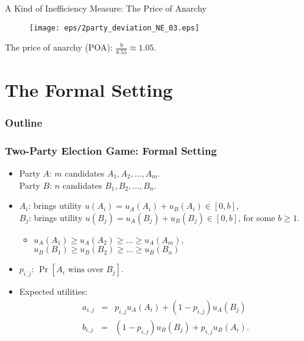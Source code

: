 \documentclass[xcolor=dvipsnames,envcountsect]{beamer}
\begin{document}
\begin{frame}{A Kind of Inefficiency Measure: The Price of Anarchy}
	\begin{figure}
		\begin{center}
			\texttt{[image: eps/2party\_deviation\_NE\_03.eps]}
		\end{center}
	\end{figure}
\vspace{-7pt}
\begin{itemize}
\end{itemize}
\end{frame}



\section{The Formal Setting}


\begin{frame}
\frametitle{Outline}
\end{frame}


\begin{frame}
\frametitle{Two-Party Election Game: Formal Setting}
\begin{itemize}
\item Party $A$: $m$ candidates $A_1,A_2,\ldots,A_m$. \\Party $B$: $n$ candidates $B_1,B_2,\ldots,B_n$.
\vspace{8pt}
\item $A_i$: brings utility $u(A_i) = u_A(A_i) + u_B(A_i) \in [0,b]$, \\$B_j$: brings utility $u(B_j) = u_A(B_j) + u_B(B_j) \in [0,b]$, for some $b\geq 1$. 
	\begin{itemize}
		\item $u_A(A_1)\geq u_A(A_2)\geq \ldots \geq u_A(A_m)$,  $u_B(B_1)\geq u_B(B_2)\geq \ldots \geq u_B(B_n)$
	\end{itemize}
\vspace{5pt}
\item $p_{i,j}$: $\Pr[A_i \mbox{ wins over } B_j]$. 
\vspace{5pt}
\item Expected utilities:
\vspace{-7pt}
\begin{eqnarray*}
	a_{i,j} &=& p_{i,j}u_A(A_i) + (1-p_{i,j})u_A(B_j)\\
	b_{i,j} &=& (1-p_{i,j})u_B(B_j) + p_{i,j}u_B(A_i).
\end{eqnarray*} 
\end{itemize}
\end{frame}
\end{document}
